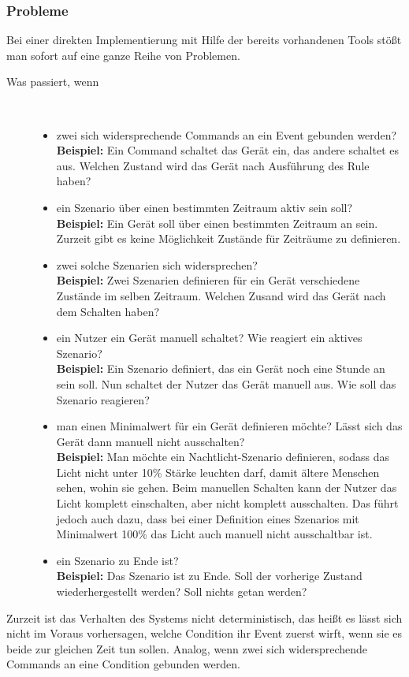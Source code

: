 \subsubsection{Probleme}
Bei einer direkten Implementierung mit Hilfe der bereits vorhandenen Tools stößt man sofort auf eine ganze Reihe von Problemen. 
\begin{description}
	\item[Was passiert, wenn]~\par
	\begin{itemize}
		\item zwei sich widersprechende Commands an ein Event gebunden werden?\\
\textbf{Beispiel:} Ein Command schaltet das Gerät ein, das andere schaltet es aus. Welchen Zustand wird das Gerät nach Ausführung des Rule haben?
		
		\item ein Szenario über einen bestimmten Zeitraum aktiv sein soll?\\
		\textbf{Beispiel:} Ein Gerät soll über einen bestimmten Zeitraum an sein. Zurzeit gibt es keine Möglichkeit Zustände für Zeiträume zu definieren.
		
		\item zwei solche Szenarien sich widersprechen?\\
		\textbf{Beispiel:} Zwei Szenarien definieren für ein Gerät verschiedene Zustände im selben Zeitraum. Welchen Zusand wird das Gerät nach dem Schalten haben?
		
		\item ein Nutzer ein Gerät manuell schaltet? Wie reagiert ein aktives Szenario?\\
		\textbf{Beispiel:} Ein Szenario definiert, das ein Gerät noch eine Stunde an sein soll. Nun schaltet der Nutzer das Gerät manuell aus. Wie soll das Szenario reagieren?
		
		\item man einen Minimalwert für ein Gerät definieren möchte? Lässt sich das Gerät 	dann manuell nicht ausschalten?\\
		\textbf{Beispiel:} Man möchte ein Nachtlicht-Szenario definieren, sodass das Licht nicht unter 10\% Stärke leuchten darf, damit ältere Menschen sehen, wohin sie gehen. Beim manuellen Schalten kann der Nutzer das Licht komplett einschalten, aber nicht komplett ausschalten. Das führt jedoch auch dazu, dass bei einer Definition eines Szenarios mit Minimalwert 100\% das Licht auch manuell nicht ausschaltbar ist.
		
		\item ein Szenario zu Ende ist? \\
		\textbf{Beispiel:} Das Szenario ist zu Ende. Soll der vorherige Zustand wiederhergestellt werden? Soll nichts getan werden? 
	\end{itemize}
\end{description}
Zurzeit ist das Verhalten des Systems nicht deterministisch, das heißt es lässt sich nicht im Voraus vorhersagen, welche Condition ihr Event zuerst wirft, wenn sie es beide zur gleichen Zeit tun sollen. Analog, wenn zwei sich widersprechende Commands an eine Condition gebunden werden.


